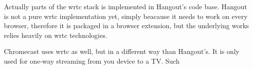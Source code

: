 
Actually parts of the \gls{wrtc} stack is implemented in Hangout's code base. Hangout is not a pure \gls{wrtc} implementation yet, simply beacause it needs to work on every browser, therefore it is packaged in a browser extension, but the underlying works relies heavily on \gls{wrtc} technologies.

Chromecast uses \gls{wrtc} as well, but in a different way than Hangout's. It is only used for one-way streaming from you device to a TV. Such 